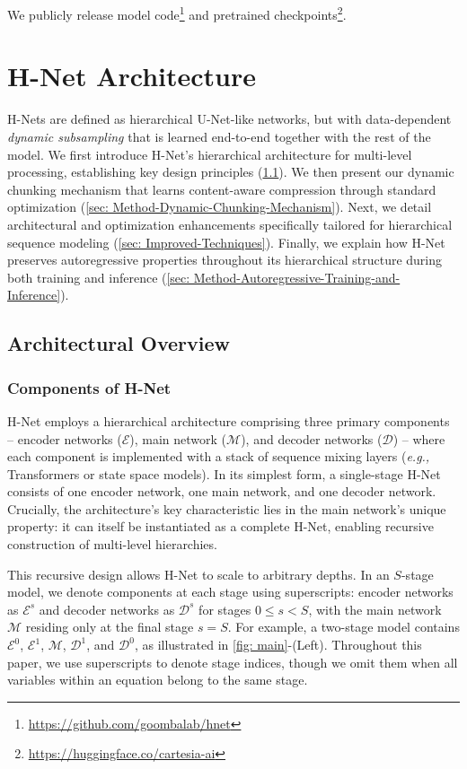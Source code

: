 \documentclass{article}
\newcommand{\model}{H-Net}
\newcommand{\encoder}{encoder network}
\newcommand{\main}{main network}
\newcommand{\decoder}{decoder network}
\newcommand{\eg}{\emph{e.g.,}}
\theoremstyle{plain}
\theoremstyle{remark}
\begin{document}
We publicly release model code\footnote{\url{https://github.com/goombalab/hnet}} and pretrained checkpoints\footnote{\url{https://huggingface.co/cartesia-ai}}. 

\section{\model{} Architecture}
\label{sec: method}

H-Nets are defined as hierarchical U-Net-like networks, but with data-dependent \emph{dynamic subsampling} that is learned end-to-end together with the rest of the model.
We first introduce H-Net's hierarchical architecture for multi-level processing, establishing key design principles (\cref{sec: Method-Architectural-Overview}).
We then present our dynamic chunking mechanism that learns content-aware compression through standard optimization (\cref{sec: Method-Dynamic-Chunking-Mechanism}).
Next, we detail architectural and optimization enhancements specifically tailored for hierarchical sequence modeling (\cref{sec: Improved-Techniques}).
Finally, we explain how H-Net preserves autoregressive properties throughout its hierarchical structure during both training and inference (\cref{sec: Method-Autoregressive-Training-and-Inference}).

\subsection{Architectural Overview}
\label{sec: Method-Architectural-Overview}

\subsubsection{Components of \model{}}

\model{} employs a hierarchical architecture comprising three primary components -- \encoder{s} ($\mathcal{E}$), \main{} ($\mathcal{M}$), and \decoder{s} ($\mathcal{D}$)  -- where each component is implemented with a stack of sequence mixing layers (\eg{} Transformers or state space models).
In its simplest form, a single-stage \model{} consists of one \encoder{}, one \main{}, and one \decoder{}.
Crucially, the architecture's key characteristic lies in the \main{}'s unique property: it can itself be instantiated as a complete \model{}, enabling recursive construction of multi-level hierarchies.

This recursive design allows \model{} to scale to arbitrary depths.
In an $S$-stage model, we denote components at each stage using superscripts: \encoder{s} as $\mathcal{E}^s$ and \decoder{s} as $\mathcal{D}^s$ for stages $0 \leq s < S$, with the \main{} $\mathcal{M}$ residing only at the final stage $s=S$.
For example, a two-stage model contains $\mathcal{E}^0$, $\mathcal{E}^1$, $\mathcal{M}$, $\mathcal{D}^1$, and $\mathcal{D}^0$, as illustrated in \cref{fig: main}-(Left).
Throughout this paper, we use superscripts to denote stage indices, though we omit them when all variables within an equation belong to the same stage.
\end{document}
